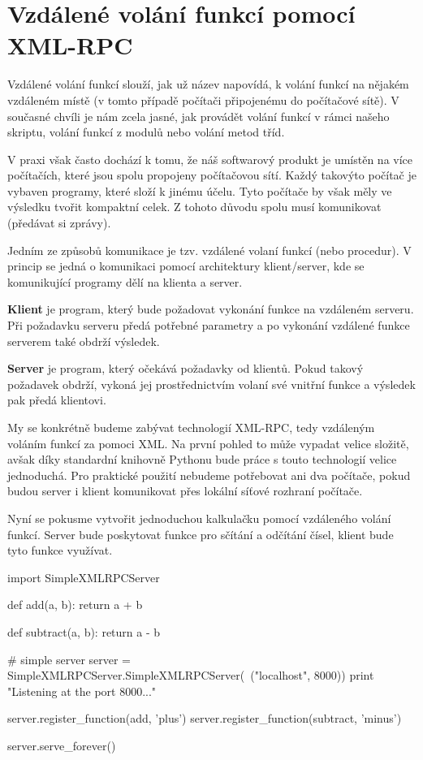 \section{Vzdálené volání funkcí pomocí XML-RPC}
Vzdálené volání funkcí slouží, jak už název napovídá, k volání funkcí na nějakém vzdáleném místě (v tomto případě počítači připojenému do počítačové sítě). V současné chvíli je nám zcela jasné, jak provádět volání funkcí v rámci našeho skriptu, volání funkcí z modulů nebo volání metod tříd.

V praxi však často dochází k tomu, že náš softwarový produkt je umí\-stěn na více počítačích, které jsou spolu propojeny počítačovou sítí. Každý takovýto počítač je vybaven programy, které složí k jinému účelu. Tyto počítače by však měly ve výsledku tvořit kompaktní celek. Z tohoto důvodu spolu musí komunikovat (předávat si zprávy).

Jedním ze způsobů komunikace je tzv. vzdálené volaní funkcí (nebo procedur). V princip se jedná o komunikaci pomocí architektury klient/server, kde se komunikující programy dělí na klienta a server.

\textbf{Klient} je program, který bude požadovat vykonání funkce na vzdále\-né\-m serveru. Při požadavku serveru předá potřebné parametry a po vykonání vzdálené funkce serverem také obdrží výsledek.

\textbf{Server} je program, který očekává požadavky od klientů. Pokud takový požadavek obdrží, vykoná jej prostřednictvím volaní své vnitřní funkce a výsledek pak předá klientovi.

My se konkrétně budeme zabývat technologií XML-RPC, tedy vzdále\-ným voláním funkcí za pomoci XML. Na první pohled to může vypadat velice složitě, avšak díky standardní knihovně Pythonu bude práce s touto technologií velice jednoduchá. Pro praktické použití nebudeme potřebovat ani dva počítače, pokud budou server i klient komunikovat přes lokální síťové rozhraní počítače.

Nyní se pokusme vytvořit jednoduchou kalkulačku pomocí vzdáleného volání funkcí. Server bude poskytovat funkce pro sčítání a odčítání čísel, klient bude tyto funkce využívat.

\begin{python}
import SimpleXMLRPCServer

def add(a, b):
    return a + b

def subtract(a, b):
    return a - b

# simple server
server = SimpleXMLRPCServer.SimpleXMLRPCServer(\
("localhost", 8000))
print "Listening at the port 8000..."

server.register_function(add, 'plus')
server.register_function(subtract, 'minus')

server.serve_forever()
\end{python}

